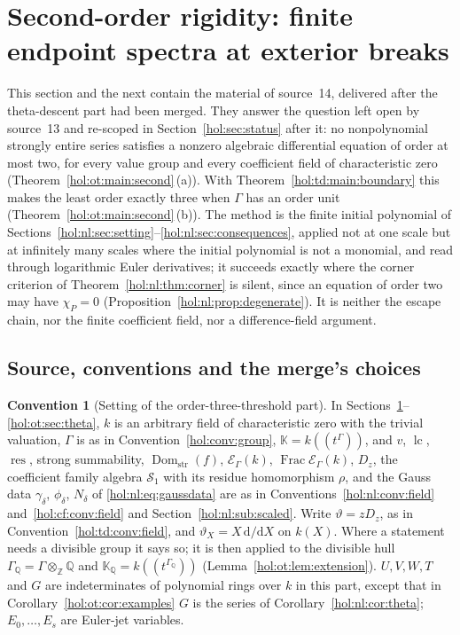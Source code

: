 \documentclass[11pt]{article}
\numberwithin{equation}{section}
\theoremstyle{definition}
\newtheorem{convention}[theorem]{Convention}
\theoremstyle{remark}
\newcommand{\Q}{\mathbb Q}
\newcommand{\Z}{\mathbb Z}
\newcommand{\lc}{\operatorname{lc}}
\newcommand{\res}{\operatorname{res}}
\newcommand{\Dom}{\operatorname{Dom}_{\mathrm{str}}}
\newcommand{\KK}{\mathbb K}
\newcommand{\EK}{\mathcal E_\Gamma(k)}
\newcommand{\Sfam}{\mathcal S}
\newcommand{\FE}{\operatorname{Frac}\EK}
\begin{document}
\section{Second-order rigidity: finite endpoint spectra at exterior breaks}
\label{hol:ot:sec:setting}

This section and the next contain the material of source~14, delivered after
the theta-descent part had been merged. They answer the question left open by
source~13 and re-scoped in Section~\ref{hol:sec:status} after it: no
nonpolynomial strongly entire series satisfies a nonzero algebraic
differential equation of order at most two, for every value group and every
coefficient field of characteristic zero
(Theorem~\ref{hol:ot:main:second}\,(a)). With
Theorem~\ref{hol:td:main:boundary} this makes the least order exactly three
when $\Gamma$ has an order unit (Theorem~\ref{hol:ot:main:second}\,(b)). The
method is the finite initial polynomial of
Sections~\ref{hol:nl:sec:setting}--\ref{hol:nl:sec:consequences}, applied not
at one scale but at infinitely many scales where the initial polynomial is not
a monomial, and read through logarithmic Euler derivatives; it succeeds
exactly where the corner criterion of Theorem~\ref{hol:nl:thm:corner} is
silent, since an equation of order two may have $\chi_P=0$
(Proposition~\ref{hol:nl:prop:degenerate}). It is neither the escape chain,
nor the finite coefficient field, nor a difference-field argument.

\subsection{Source, conventions and the merge's choices}
\label{hol:ot:sub:conventions}

\begin{convention}[Setting of the order-three-threshold part]
\label{hol:ot:conv:field}
In Sections~\ref{hol:ot:sec:setting}--\ref{hol:ot:sec:theta}, $k$ is an
arbitrary field of characteristic zero with the trivial valuation, $\Gamma$ is
as in Convention~\ref{hol:conv:group}, $\KK=k((t^\Gamma))$, and $v$, $\lc$,
$\res$, strong summability, $\Dom(f)$, $\EK$, $\FE$, $D_z$, the coefficient
family algebra $\Sfam_1$ with its residue homomorphism $\rho$, and the Gauss
data $\gamma_\delta$, $\phi_\delta$, $N_\delta$ of \eqref{hol:nl:eq:gaussdata}
are as in Conventions~\ref{hol:nl:conv:field} and~\ref{hol:cf:conv:field} and
Section~\ref{hol:nl:sub:scaled}. Write $\vartheta=zD_z$, as in
Convention~\ref{hol:td:conv:field}, and $\vartheta_X=X\,\mathrm d/\mathrm dX$
on $k(X)$. Where a statement needs a divisible group it says so; it is then
applied to the divisible hull $\Gamma_\Q=\Gamma\otimes_\Z\Q$ and
$\KK_\Q=k((t^{\Gamma_\Q}))$ (Lemma~\ref{hol:ot:lem:extension}). $U,V,W,T$
and $G$ are indeterminates of polynomial rings over $k$ in this part, except
that in Corollary~\ref{hol:ot:cor:examples} $G$ is the series of
Corollary~\ref{hol:nl:cor:theta}; $E_0,\ldots,E_s$ are Euler-jet variables.
\end{convention}
\end{document}
